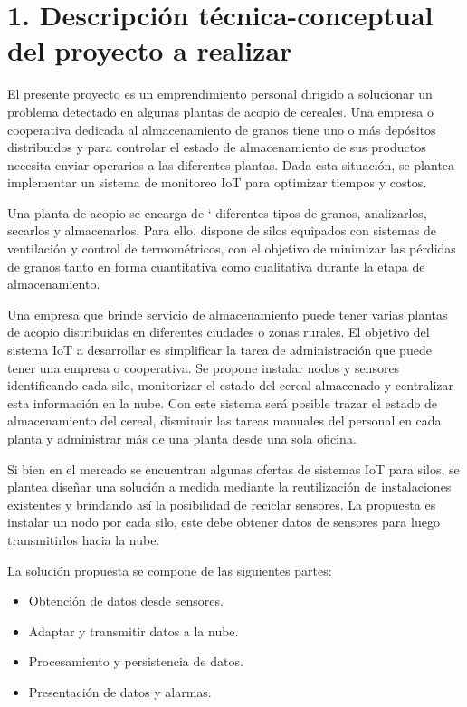 \documentclass[
11pt, %
]{charter}
\begin{document}
\section{1. Descripción técnica-conceptual del proyecto a realizar}
\label{sec:descripcion}

El presente proyecto es un emprendimiento personal dirigido a solucionar un problema detectado en algunas plantas de acopio de cereales. Una empresa  o cooperativa dedicada al almacenamiento de granos tiene uno o más depósitos distribuidos y para controlar el estado de almacenamiento de sus productos necesita enviar operarios a las diferentes plantas. Dada esta situación, se plantea implementar un sistema de monitoreo IoT para optimizar tiempos y costos. 

Una planta de acopio se encarga de ` diferentes tipos de granos, analizarlos, secarlos y almacenarlos. Para ello, dispone de silos equipados con sistemas de ventilación y control de termométricos, con el objetivo de minimizar las pérdidas de granos tanto en forma cuantitativa como cualitativa durante la etapa de almacenamiento. 

Una empresa que brinde servicio de almacenamiento puede tener varias plantas de acopio distribuidas en diferentes ciudades o zonas rurales. El objetivo del sistema IoT a desarrollar es simplificar la tarea de administración que puede tener una empresa o cooperativa. Se propone instalar nodos y sensores identificando cada silo, monitorizar el estado del cereal almacenado y centralizar esta información en la nube. Con este sistema será posible trazar el estado de almacenamiento del cereal, disminuir las tareas manuales del personal en cada planta y administrar más de una planta desde una sola oficina. 

Si bien en el mercado se encuentran algunas ofertas de sistemas IoT para silos, se plantea diseñar una solución a medida mediante la reutilización de instalaciones existentes y brindando así la posibilidad de reciclar sensores. La propuesta es instalar un nodo por cada silo, este debe obtener datos de sensores para luego transmitirlos hacia la nube. 

La solución propuesta se compone de las siguientes partes: 
\begin{itemize}
	\item Obtención de datos desde sensores. 
	\item Adaptar y transmitir datos a la nube.
	\item Procesamiento y persistencia de datos.
	\item Presentación de datos y alarmas. 
\end{itemize}
\end{document}
